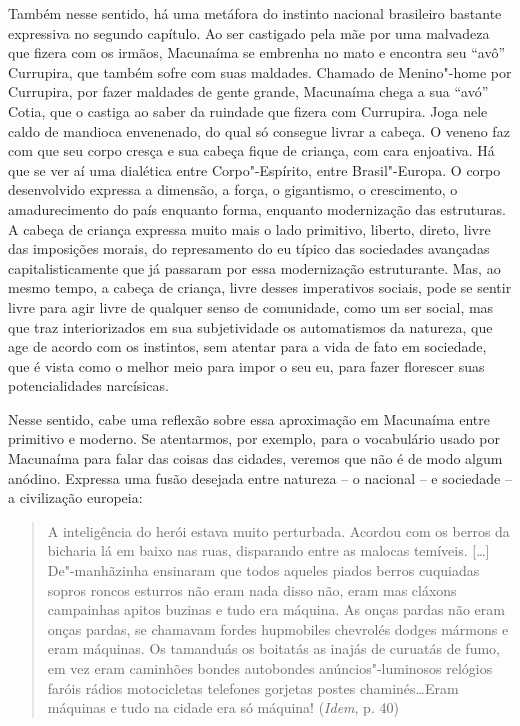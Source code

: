 Também nesse sentido, há uma metáfora do instinto nacional brasileiro
bastante expressiva no segundo capítulo. Ao ser castigado pela mãe por
uma malvadeza que fizera com os irmãos, Macunaíma se embrenha no mato e
encontra seu ``avô'' Currupira, que também sofre com suas maldades.
Chamado de Menino"-home por Currupira, por fazer maldades de gente
grande, Macunaíma chega a sua ``avó'' Cotia, que o castiga ao saber da
ruindade que fizera com Currupira. Joga nele caldo de mandioca
envenenado, do qual só consegue livrar a cabeça. O veneno faz com
que seu corpo cresça e sua cabeça fique de criança, com cara enjoativa.
Há que se ver aí uma dialética entre Corpo"-Espírito, entre
Brasil"-Europa. O corpo desenvolvido expressa a dimensão, a força, o
gigantismo, o crescimento, o amadurecimento do país enquanto forma,
enquanto modernização das estruturas. A cabeça de criança expressa muito
mais o lado primitivo, liberto, direto, livre das imposições morais, do
represamento do eu típico das sociedades avançadas capitalisticamente
que já passaram por essa modernização estruturante. Mas, ao mesmo tempo,
a cabeça de criança, livre desses imperativos sociais, pode se sentir
livre para agir livre de qualquer senso de comunidade, como um ser
social, mas que traz interiorizados em sua subjetividade os automatismos
da natureza, que age de acordo com os instintos, sem atentar para a vida
de fato em sociedade, que é vista como o melhor meio para impor o seu
eu, para fazer florescer suas potencialidades narcísicas.

Nesse sentido, cabe uma reflexão sobre essa aproximação em Macunaíma
entre primitivo e moderno. Se atentarmos, por exemplo, para o
vocabulário usado por Macunaíma para falar das coisas das cidades,
veremos que não é de modo algum anódino. Expressa uma fusão desejada
entre natureza -- o nacional -- e sociedade -- a civilização europeia:

\begin{quote}
A inteligência do herói estava muito perturbada. Acordou com os berros
da bicharia lá em baixo nas ruas, disparando entre as malocas temíveis.
[\ldots{}] De"-manhãzinha ensinaram que todos aqueles piados berros
cuquiadas sopros roncos esturros não eram nada disso não, eram mas
cláxons campainhas apitos buzinas e tudo era máquina. As onças pardas
não eram onças pardas, se chamavam fordes hupmobiles chevrolés dodges
mármons e eram máquinas. Os tamanduás os boitatás as inajás de curuatás
de fumo, em vez eram caminhões bondes autobondes anúncios"-luminosos
relógios faróis rádios motocicletas telefones gorjetas postes
chaminés\ldots{}Eram máquinas e tudo na cidade era só máquina! (\emph{Idem},
p. 40)
\end{quote}

